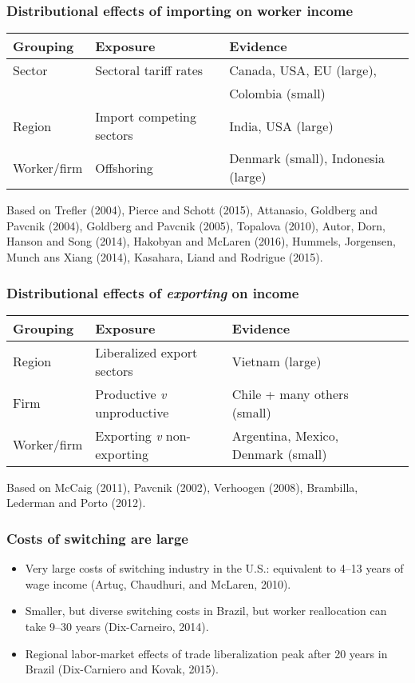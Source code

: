 \documentclass[aspectratio=169,compress,mathserif]{beamer}
\newcounter{ora}
\begin{document}
\begin{frame}\frametitle{Distributional effects of importing on worker income}\hypertarget{Distributional effects of importing on worker income}{}
\begin{tabular}{llll}
Grouping & Exposure & Evidence  \\
\hline
Sector & Sectoral tariff rates & Canada, USA, EU (large),\\
 && Colombia (small) \\
Region & Import competing sectors & India, USA (large) \\
Worker/firm & Offshoring & Denmark (small), Indonesia (large) \\
\end{tabular}


\bigskip
{\footnotesize Based on 
Trefler (2004),
Pierce and Schott (2015),
Attanasio, Goldberg and Pavcnik (2004),
Goldberg and Pavcnik (2005),
Topalova (2010),
Autor, Dorn, Hanson and Song (2014),
Hakobyan and McLaren (2016),
Hummels, Jorgensen, Munch ans Xiang (2014),
Kasahara, Liand and Rodrigue (2015).}


\end{frame}



\begin{frame}\frametitle{Distributional effects of \emph{exporting} on income}\hypertarget{Distributional effects of \emph{exporting} on income}{}
\begin{tabular}{llll}
Grouping & Exposure & Evidence  \\
\hline
Region & Liberalized export sectors & Vietnam (large)\\
Firm & Productive \emph{v} unproductive & Chile + many others (small) \\
Worker/firm & Exporting \emph{v} non-exporting & Argentina, Mexico, Denmark (small)  \\
\end{tabular}


\bigskip
{\footnotesize Based on 
McCaig (2011),
Pavcnik (2002),
Verhoogen (2008),
Brambilla, Lederman and Porto (2012).}




\end{frame}



\begin{frame}\frametitle{Costs of switching are large}\hypertarget{Costs of switching are large}{}
\begin{itemize}
\item Very large costs of switching industry in the U.S.: equivalent to 4--13 years of wage income (Artuç, Chaudhuri, and McLaren, 2010).

\item Smaller, but diverse switching costs in Brazil, but worker reallocation can take 9--30 years (Dix-Carneiro, 2014).

\item Regional labor-market effects of trade liberalization peak after 20 years in Brazil (Dix-Carniero and Kovak, 2015).


\end{itemize}
\end{frame}
\end{document}

